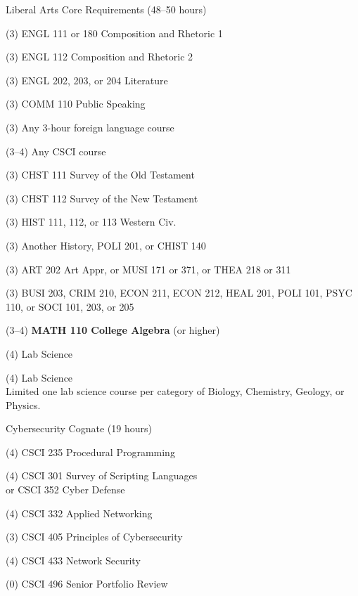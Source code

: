 \begin{reqgroup}{Liberal Arts Core Requirements (48--50 hours)}
\begin{checklist}
\begin{minipage}[t]{0.5\linewidth}
	\item (3) ENGL 111 or 180 Composition and Rhetoric 1
	\item (3) ENGL 112 Composition and Rhetoric 2
	\item (3) ENGL 202, 203, or 204 Literature
	\item (3) COMM 110 Public Speaking
	\item (3) Any 3-hour foreign language course
	\item (3--4) Any CSCI course
	\item (3) CHST 111  Survey of the Old Testament
	\item (3) CHST 112  Survey of the New Testament
	\item (3) HIST 111, 112, or 113 Western Civ.
\end{minipage}
\begin{minipage}[t]{0.5\linewidth}
	\item (3)	Another History, POLI 201, or CHIST 140
	\item (3)	ART 202 Art Appr, or MUSI 171 or 371, or THEA 218 or 311
	\item (3)	BUSI 203, CRIM 210, ECON 211, ECON 212, HEAL 201, POLI 101, PSYC 110, or SOCI 101, 203, or 205
	\item (3--4)	\textbf{MATH 110 College Algebra} (or higher)
	\item (4)	Lab Science
	\item (4)	Lab Science\\Limited one lab science course per category of Biology, Chemistry,
Geology, or Physics.
\end{minipage}
\end{checklist}
\end{reqgroup}


\begin{reqgroup}{Cybersecurity Cognate (19 hours)}%
\begin{checklist}%
\begin{minipage}[t]{0.5\linewidth}%
	\item (4) CSCI 235 Procedural Programming
	\item (4) CSCI 301 Survey of Scripting Languages\\
		or CSCI 352 Cyber Defense
	\item (4) CSCI 332 Applied Networking
\end{minipage}%
\begin{minipage}[t]{0.5\linewidth}
	\item (3) CSCI 405 Principles of Cybersecurity
	\item (4) CSCI 433 Network Security
	\item (0) CSCI 496 Senior Portfolio Review
\end{minipage}
\end{checklist}
\end{reqgroup}

